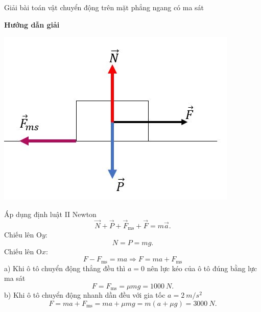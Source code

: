 \begin{dang}{Giải bài toán vật chuyển động trên mặt phẳng ngang có ma sát}
	{	\begin{center}
			\textbf{Hướng dẫn giải}
		\end{center}
		\begin{center}
			\includegraphics[scale=0.6]{../figs/VN10-PH-15-A-005-3-V2-03.JPG}
		\end{center} 
		Áp dụng định luật II Newton
		\begin{equation*}
			\vec{N}+\vec{P} + \vec{F}_{\text{ms}} + \vec{F} = m\vec{a}.
		\end{equation*}
		Chiếu lên O$y$:
		\begin{equation*}
			N=P = mg.
		\end{equation*}
		Chiếu lên O$x$:
		\begin{equation*}
			F-F_{\text{ms}} = ma \Rightarrow F = ma + F_{\text{ms}}
		\end{equation*}
		a) Khi ô tô chuyển động thẳng đều thì $a=0$ nên lực kéo của ô tô đúng bằng lực ma sát
		\begin{equation*}
			F=F_{\text{ms}} = \mu mg = \SI{1000}{N}.
		\end{equation*}
		b) Khi ô tô chuyển động nhanh dần đều với gia tốc $a = \SI{2}{m/s^2}$ 
		\begin{equation*}
			F= ma + F_{\text{ms}} = ma + \mu mg = m(a+ \mu g) = \SI{3000}{N}.
		\end{equation*}
		
}
\end{dang}
